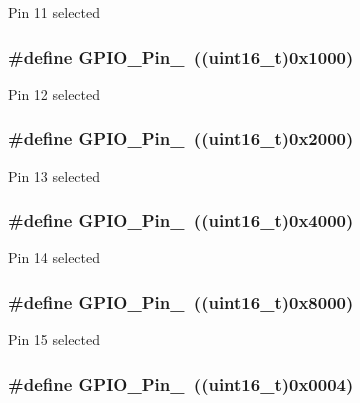 Pin 11 selected \hypertarget{group__GPIO__pins__define_gada91257dcaab2c86f75fbd8e4b52b98c}{
\subsubsection[{GPIO\_\-Pin\_\-12}]{\setlength{\rightskip}{0pt plus 5cm}\#define GPIO\_\-Pin\_~((uint16\_\-t)0x1000)}}
\label{group__GPIO__pins__define_gada91257dcaab2c86f75fbd8e4b52b98c}
Pin 12 selected \hypertarget{group__GPIO__pins__define_ga4155a41c433f3657b9c79cfbd4240966}{
\subsubsection[{GPIO\_\-Pin\_\-13}]{\setlength{\rightskip}{0pt plus 5cm}\#define GPIO\_\-Pin\_~((uint16\_\-t)0x2000)}}
\label{group__GPIO__pins__define_ga4155a41c433f3657b9c79cfbd4240966}
Pin 13 selected \hypertarget{group__GPIO__pins__define_ga21cd1d89c0c061a6f09c5a842610bee5}{
\subsubsection[{GPIO\_\-Pin\_\-14}]{\setlength{\rightskip}{0pt plus 5cm}\#define GPIO\_\-Pin\_~((uint16\_\-t)0x4000)}}
\label{group__GPIO__pins__define_ga21cd1d89c0c061a6f09c5a842610bee5}
Pin 14 selected \hypertarget{group__GPIO__pins__define_gae686a9fc47cf3e420e5db0784210711d}{
\subsubsection[{GPIO\_\-Pin\_\-15}]{\setlength{\rightskip}{0pt plus 5cm}\#define GPIO\_\-Pin\_~((uint16\_\-t)0x8000)}}
\label{group__GPIO__pins__define_gae686a9fc47cf3e420e5db0784210711d}
Pin 15 selected \hypertarget{group__GPIO__pins__define_gabdf6630324b2f99360537a310687187c}{
\subsubsection[{GPIO\_\-Pin\_\-2}]{\setlength{\rightskip}{0pt plus 5cm}\#define GPIO\_\-Pin\_~((uint16\_\-t)0x0004)}}
